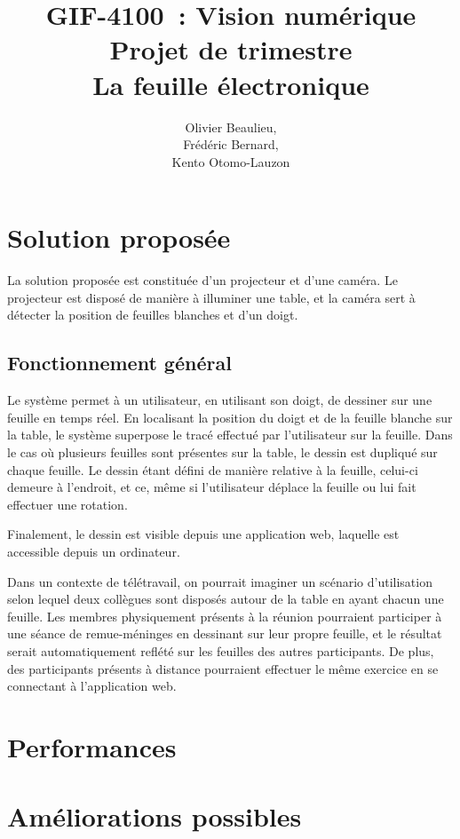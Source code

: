 \documentclass[11pt]{report}
\title{\textbf{GIF-4100 : Vision numérique\\ Projet de trimestre \\La feuille électronique}}
\author{Olivier Beaulieu,\\Frédéric Bernard,\\Kento Otomo-Lauzon}
\begin{document}
\maketitle
 

\newpage

\section{Solution proposée}
La solution proposée est constituée d'un projecteur et d'une caméra. Le
projecteur est disposé de manière à illuminer une table, et la caméra sert à
détecter la position de feuilles blanches et d'un doigt.

\subsection{Fonctionnement général}
Le système permet à un utilisateur, en utilisant son doigt, de dessiner sur une
feuille en temps réel. En localisant la position du doigt et de la feuille
blanche sur la table, le système superpose le tracé effectué par l'utilisateur
sur la feuille. Dans le cas où plusieurs feuilles sont présentes sur la table,
le dessin est dupliqué sur chaque feuille. Le dessin étant défini de manière
relative à la feuille, celui-ci demeure à l'endroit, et ce, même si
l'utilisateur déplace la feuille ou lui fait effectuer une rotation.

Finalement, le dessin est visible depuis une application web, laquelle est
accessible depuis un ordinateur.

Dans un contexte de télétravail, on pourrait imaginer un scénario d'utilisation
selon lequel deux collègues sont disposés autour de la table en ayant chacun une
feuille. Les membres physiquement présents à la réunion pourraient participer à
une séance de remue-méninges en dessinant sur leur propre feuille, et le
résultat serait automatiquement reflété sur les feuilles des autres
participants. De plus, des participants présents à distance pourraient effectuer
le même exercice en se connectant à l'application web. 

\subsection{}

\section{Performances}

\section{Améliorations possibles}
\end{document}
